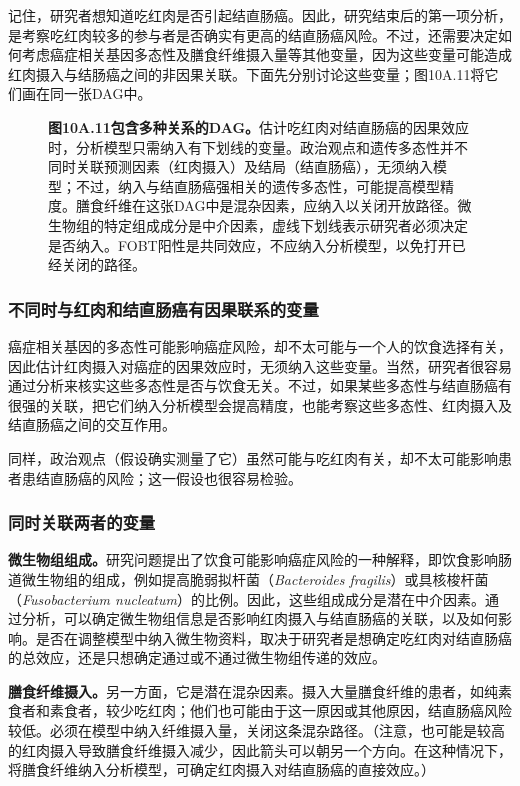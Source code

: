 记住，研究者想知道吃红肉是否引起结直肠癌。因此，研究结束后的第一项分析，是考察吃红肉较多的参与者是否确实有更高的结直肠癌风险。不过，还需要决定如何考虑癌症相关基因多态性及膳食纤维摄入量等其他变量，因为这些变量可能造成红肉摄入与结肠癌之间的非因果关联。下面先分别讨论这些变量；图10A.11将它们画在同一张DAG中。
\par
\begin{figure}[htbp]\centering\chTenManyDAG
\caption*{\textbf{图10A.11\quad 包含多种关系的DAG。}估计吃红肉对结直肠癌的因果效应时，分析模型只需纳入有下划线的变量。政治观点和遗传多态性并不同时关联预测因素（红肉摄入）及结局（结直肠癌），无须纳入模型；不过，纳入与结直肠癌强相关的遗传多态性，可能提高模型精度。膳食纤维在这张DAG中是混杂因素，应纳入以关闭开放路径。微生物组的特定组成成分是中介因素，虚线下划线表示研究者必须决定是否纳入。FOBT阳性是共同效应，不应纳入分析模型，以免打开已经关闭的路径。}
\end{figure}
\par

\subsubsection{不同时与红肉和结直肠癌有因果联系的变量}
癌症相关基因的多态性可能影响癌症风险，却不太可能与一个人的饮食选择有关，因此估计红肉摄入对癌症的因果效应时，无须纳入这些变量。当然，研究者很容易通过分析来核实这些多态性是否与饮食无关。不过，如果某些多态性与结直肠癌有很强的关联，把它们纳入分析模型会提高精度，也能考察这些多态性、红肉摄入及结直肠癌之间的交互作用。

同样，政治观点（假设确实测量了它）虽然可能与吃红肉有关，却不太可能影响患者患结直肠癌的风险；这一假设也很容易检验。

\subsubsection{同时关联两者的变量}
\textbf{微生物组组成。}研究问题提出了饮食可能影响癌症风险的一种解释，即饮食影响肠道微生物组的组成，例如提高脆弱拟杆菌（\textit{Bacteroides fragilis}）或具核梭杆菌（\textit{Fusobacterium nucleatum}）的比例。因此，这些组成成分是潜在中介因素。通过分析，可以确定微生物组信息是否影响红肉摄入与结直肠癌的关联，以及如何影响。是否在调整模型中纳入微生物资料，取决于研究者是想确定吃红肉对结直肠癌的总效应，还是只想确定通过或不通过微生物组传递的效应。

\textbf{膳食纤维摄入。}另一方面，它是潜在混杂因素。摄入大量膳食纤维的患者，如纯素食者和素食者，较少吃红肉；他们也可能由于这一原因或其他原因，结直肠癌风险较低。必须在模型中纳入纤维摄入量，关闭这条混杂路径。（注意，也可能是较高的红肉摄入导致膳食纤维摄入减少，因此箭头可以朝另一个方向。在这种情况下，将膳食纤维纳入分析模型，可确定红肉摄入对结直肠癌的直接效应。）

